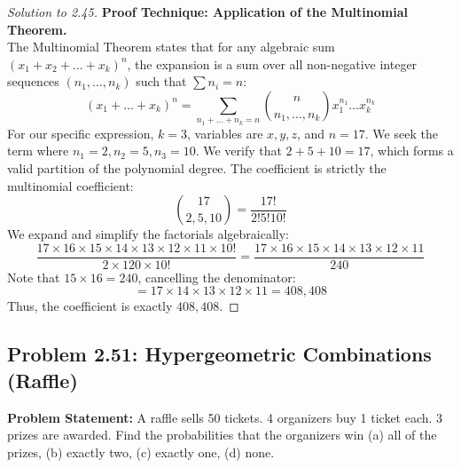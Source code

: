 \documentclass[11pt]{article}
\theoremstyle{definition}
\theoremstyle{plain}
\theoremstyle{remark}
\begin{document}
\begin{proof}[Solution to 2.45]
\textbf{Proof Technique: Application of the Multinomial Theorem.} \\
The Multinomial Theorem states that for any algebraic sum $(x_1 + x_2 + \dots + x_k)^n$, the expansion is a sum over all non-negative integer sequences $(n_1, \dots, n_k)$ such that $\sum n_i = n$:
\[
(x_1 + \dots + x_k)^n = \sum_{n_1+\dots+n_k=n} \binom{n}{n_1, \dots, n_k} x_1^{n_1} \dots x_k^{n_k}
\]
For our specific expression, $k=3$, variables are $x, y, z$, and $n=17$. We seek the term where $n_1=2, n_2=5, n_3=10$. We verify that $2 + 5 + 10 = 17$, which forms a valid partition of the polynomial degree. The coefficient is strictly the multinomial coefficient:
\[
\binom{17}{2, 5, 10} = \frac{17!}{2! 5! 10!}
\]
We expand and simplify the factorials algebraically:
\[
\frac{17 \times 16 \times 15 \times 14 \times 13 \times 12 \times 11 \times 10!}{2 \times 120 \times 10!} = \frac{17 \times 16 \times 15 \times 14 \times 13 \times 12 \times 11}{240}
\]
Note that $15 \times 16 = 240$, cancelling the denominator:
\[
= 17 \times 14 \times 13 \times 12 \times 11 = 408,408
\]
Thus, the coefficient is exactly $408,408$.
\end{proof}

\subsection{Problem 2.51: Hypergeometric Combinations (Raffle)}
\textbf{Problem Statement:} A raffle sells 50 tickets. 4 organizers buy 1 ticket each. 3 prizes are awarded. Find the probabilities that the organizers win (a) all of the prizes, (b) exactly two, (c) exactly one, (d) none.
\end{document}
